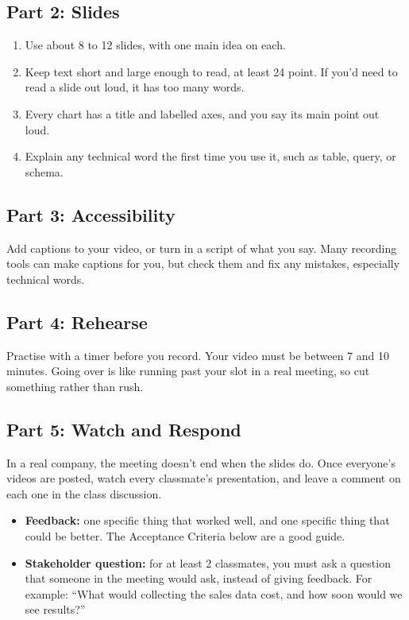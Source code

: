\documentclass[12pt]{article}
\begin{document}
\subsection*{Part 2: Slides}
\begin{enumerate}
    \item Use about 8 to 12 slides, with one main idea on each.
    \item Keep text short and large enough to read, at least 24 point. If you'd need to read a slide out loud, it has too many words.
    \item Every chart has a title and labelled axes, and you say its main point out loud.
    \item Explain any technical word the first time you use it, such as table, query, or schema.
\end{enumerate}

\subsection*{Part 3: Accessibility}
Add captions to your video, or turn in a script of what you say. Many recording tools can make captions for you, but check them and fix any mistakes, especially technical words.

\subsection*{Part 4: Rehearse}
Practise with a timer before you record. Your video must be between 7 and 10 minutes. Going over is like running past your slot in a real meeting, so cut something rather than rush.

\subsection*{Part 5: Watch and Respond}
In a real company, the meeting doesn't end when the slides do. Once everyone's videos are posted, watch every classmate's presentation, and leave a comment on each one in the class discussion.
\begin{itemize}
    \item \textbf{Feedback:} one specific thing that worked well, and one specific thing that could be better. The Acceptance Criteria below are a good guide.
    \item \textbf{Stakeholder question:} for at least 2 classmates, you must ask a question that someone in the meeting would ask, instead of giving feedback. For example: ``What would collecting the sales data cost, and how soon would we see results?''
\end{itemize}
\end{document}
